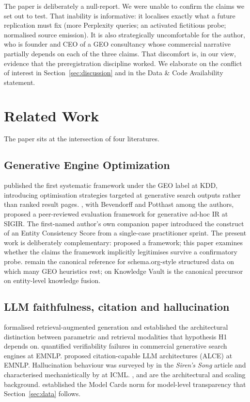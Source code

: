 \documentclass[preprint,12pt,authoryear]{elsarticle}
\begin{document}
The paper is deliberately a null-report. We were unable to confirm the claims we set out to test. That inability is informative: it localises exactly what a future replication must fix (more Perplexity queries; an activated fictitious probe; normalised source emission). It is also strategically uncomfortable for the author, who is founder and CEO of a GEO consultancy whose commercial narrative partially depends on each of the three claims. That discomfort is, in our view, evidence that the preregistration discipline worked. We elaborate on the conflict of interest in Section~\ref{sec:discussion} and in the Data \& Code Availability statement.

\section{Related Work}\label{sec:related}

The paper sits at the intersection of four literatures.

\subsection{Generative Engine Optimization}
\citet{Aggarwal2024} published the first systematic framework under the GEO label at KDD, introducing optimisation strategies targeted at generative search outputs rather than ranked result pages. \citet{Gienapp2024}, with Bevendorff and Potthast among the authors, proposed a peer-reviewed evaluation framework for generative ad-hoc IR at SIGIR. The first-named author's own companion paper \citep{Caramaschi2026} introduced the construct of an Entity Consistency Score from a single-case practitioner sprint. The present work is deliberately complementary: \citet{Caramaschi2026} proposed a framework; this paper examines whether the claims the framework implicitly legitimises survive a confirmatory probe. \citet{Guha2016} remain the canonical reference for schema.org-style structured data on which many GEO heuristics rest; \citet{Dong2014} on Knowledge Vault is the canonical precursor on entity-level knowledge fusion.

\subsection{LLM faithfulness, citation and hallucination}
\citet{Lewis2020} formalised retrieval-augmented generation and established the architectural distinction between parametric and retrieval modalities that hypothesis H1 depends on. \citet{Liu2023} quantified verifiability failures in commercial generative search engines at EMNLP. \citet{Gao2023} proposed citation-capable LLM architectures (ALCE) at EMNLP. Hallucination behaviour was surveyed by \citet{Zhang2023} in the \textit{Siren's Song} article and characterised mechanistically by \citet{Shi2023} at ICML. \citet{Brown2020}, \citet{Vaswani2017} and \citet{Kaplan2020} are the architectural and scaling background. \citet{Mitchell2019} established the Model Cards norm for model-level transparency that Section~\ref{sec:data} follows.
\end{document}
